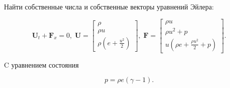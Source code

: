 	Найти собственные числа и собственные векторы уравнений Эйлера:

	\begin{equation}
		\mathbf{U}_{t} + \mathbf{F}_{x} = 0, \;
		\mathbf{U} =
		\begin{bmatrix}
			\rho \\
			\rho u \\
			\rho \left( e + \frac{u^{2}}{2} \right)
		\end{bmatrix}, \;
		\mathbf{F} =
		\begin{bmatrix}
			\rho u \\
			\rho u^{2} + p \\
			u \left( \rho e + \frac{\rho u^{2}}{2} + p \right)
		\end{bmatrix}.
	\end{equation}

%

	C уравнением состояния

	\begin{equation}
		p = \rho e \left( \gamma - 1 \right).
	\end{equation}

	
